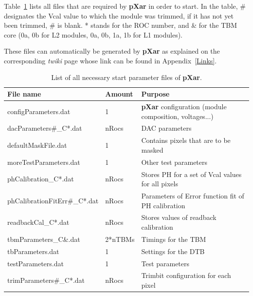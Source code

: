\documentclass[a4paper,12pt,twoside]{article}
\begin{document}
\begin{appendices}
Table~\ref{StartParameters} lists all files that are required by \textbf{pXar} in order to start. In the table, \# designates the Vcal value to which the module was trimmed, if it has not yet been trimmed, \# is blank. * stands for the ROC number, and \& for the TBM core (0a, 0b for L2 modules, 0a, 0b, 1a, 1b for L1 modules).

These files can automatically be generated by \textbf{pXar} as explained on the corresponding \textit{twiki} page whose link can be found in Appendix~\ref{Links}.

\begin{table}[h!]
\centering \advance\leftskip-0.9cm
\caption{List of all necessary start parameter files of \textbf{pXar}.}
\label{StartParameters}
\begin{tabular}{@{}lll@{}}
\toprule
File name                     & Amount  & Purpose                                                     \\ \midrule
configParameters.dat          & 1       & \textbf{pXar} configuration (module composition, voltages...) \\
dacParameters\#\_C*.dat       & nRocs   & DAC parameters                                              \\
defaultMaskFile.dat           & 1       & Contains pixels that are to be masked                       \\
moreTestParameters.dat        & 1       & Other test parameters     \\
phCalibration\_C*.dat         & nRocs   & Stores PH for a set of Vcal values  for all pixels          \\
phCalibrationFitErr\#\_C*.dat & nRocs   & Parameters of Error function fit of PH calibration   \\
readbackCal\_C*.dat           & nRocs   & Stores values of readback calibration                       \\
tbmParameters\_C\&.dat       & 2*nTBMs & Timings for the TBM                                         \\
tbParameters.dat              & 1       & Settings for the DTB                                        \\
testParameters.dat            & 1       & Test parameters                                             \\
trimParameters\#\_C*.dat      & nRocs   & Trimbit configuration for each pixel                        \\ \bottomrule
\end{tabular}
\end{table}


\end{appendices}
\end{document}
